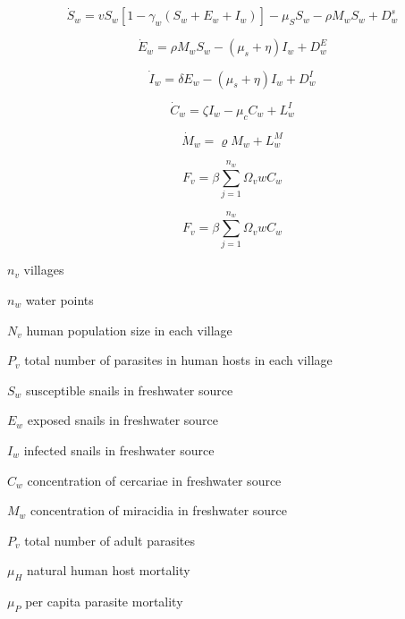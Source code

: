 \documentclass[12pt]{article}
\begin{document}
\begin{equation}\label{eq:SusceptibleRateofChange}
\dot{S}_w = vS_w [1- \gamma_w (S_w + E_w + I_w)] - \mu_S S_w - \rho M_wS_w + D_w^s
\end{equation}
 
\begin{equation}\label{eq:ExposedRateofChange}
\dot{E}_w = \rho M_wS_w - (\mu_s +\eta) I_w + D_w^E
\end{equation}
 
\begin{equation}\label{eq:InfectedRateofChange}
\dot{I}_w = \delta E_w - (\mu_s +\eta) I_w + D_w^I
\end{equation}
  
\begin{equation}\label{eq:CercariaeRateofChange}
\dot{C}_w = \zeta I_w - \mu_cC_w+  L_w^I
\end{equation}
 
\begin{equation}\label{eq:MiracidiaRateofChange}
\dot{M}_w = \varrho M_w +  L_w^M
\end{equation}
 
\begin{equation}\label{eq:ForceofInfection}
 F_v = \beta \sum_{j=1}^{n_w} \Omega_vw C_w
\end{equation}

\begin{equation}\label{eq:contact matrix}
 F_v = \beta \sum_{j=1}^{n_w} \Omega_vw C_w
\end{equation}

$n_v$ villages

$n_w$ water points

$N_v$ human population size in each village

$P_v$ total number of parasites in human hosts in each village

$S_w$ susceptible snails in freshwater source

$E_w$ exposed snails in freshwater source

$I_w$ infected snails in freshwater source

$C_w$ concentration of cercariae in freshwater source

$M_w$  concentration of miracidia in freshwater source

$P_v$ total number of adult parasites

$\mu_H$ natural human host mortality

$\mu_P$ per capita parasite mortality
\end{document}
